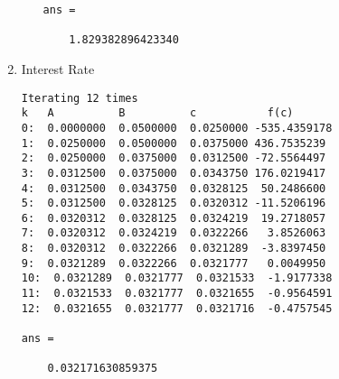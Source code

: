 \documentclass{article}
\begin{document}
\begin{enumerate}
\begin{enumerate}[label=(\alph*)]
\begin{lstlisting}
ans =

    1.829382896423340
        \end{lstlisting}
          \end{enumerate}
    \item Interest Rate
          \begin{lstlisting}
Iterating 12 times
k   A          B          c           f(c)
0:  0.0000000  0.0500000  0.0250000 -535.4359178
1:  0.0250000  0.0500000  0.0375000 436.7535239
2:  0.0250000  0.0375000  0.0312500 -72.5564497
3:  0.0312500  0.0375000  0.0343750 176.0219417
4:  0.0312500  0.0343750  0.0328125  50.2486600
5:  0.0312500  0.0328125  0.0320312 -11.5206196
6:  0.0320312  0.0328125  0.0324219  19.2718057
7:  0.0320312  0.0324219  0.0322266   3.8526063
8:  0.0320312  0.0322266  0.0321289  -3.8397450
9:  0.0321289  0.0322266  0.0321777   0.0049950
10:  0.0321289  0.0321777  0.0321533  -1.9177338
11:  0.0321533  0.0321777  0.0321655  -0.9564591
12:  0.0321655  0.0321777  0.0321716  -0.4757545

ans =

    0.032171630859375
    \end{lstlisting}
\end{enumerate}
\end{document}
